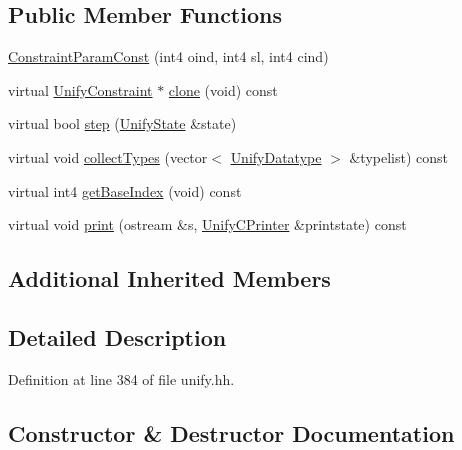 \subsection*{Public Member Functions}
\begin{DoxyCompactItemize}
\item 
\mbox{\hyperlink{class_constraint_param_const_a1383b55ae78cfb5750aebad574ec6c38}{Constraint\+Param\+Const}} (int4 oind, int4 sl, int4 cind)
\item 
virtual \mbox{\hyperlink{class_unify_constraint}{Unify\+Constraint}} $\ast$ \mbox{\hyperlink{class_constraint_param_const_abcdd802e7100afb44698c156aec6e3a5}{clone}} (void) const
\item 
virtual bool \mbox{\hyperlink{class_constraint_param_const_a938ee0ec5d67dd37947de4fb59a225bf}{step}} (\mbox{\hyperlink{class_unify_state}{Unify\+State}} \&state)
\item 
virtual void \mbox{\hyperlink{class_constraint_param_const_aaa63c83416d8aff7d7984c6ba4864763}{collect\+Types}} (vector$<$ \mbox{\hyperlink{class_unify_datatype}{Unify\+Datatype}} $>$ \&typelist) const
\item 
virtual int4 \mbox{\hyperlink{class_constraint_param_const_a6e000a8f053ad75f91b94483cedbf814}{get\+Base\+Index}} (void) const
\item 
virtual void \mbox{\hyperlink{class_constraint_param_const_a64c35324d7bed202b854edb51a0abc08}{print}} (ostream \&s, \mbox{\hyperlink{class_unify_c_printer}{Unify\+C\+Printer}} \&printstate) const
\end{DoxyCompactItemize}
\subsection*{Additional Inherited Members}


\subsection{Detailed Description}


Definition at line 384 of file unify.\+hh.



\subsection{Constructor \& Destructor Documentation}
\mbox{\label{class_constraint_param_const_a1383b55ae78cfb5750aebad574ec6c38}} 
